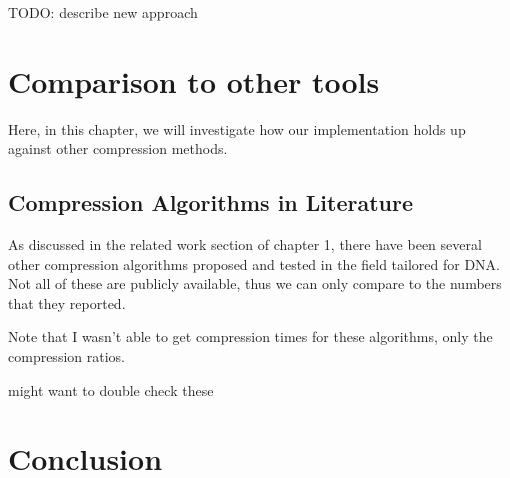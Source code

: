 \documentclass[12pt,twoside]{reedthesis}
\begin{document}
TODO: describe new approach

\hypertarget{comparison-to-other-tools}{%
\chapter{Comparison to other tools}\label{comparison-to-other-tools}}

Here, in this chapter, we will investigate how our implementation holds up against other compression methods.

\hypertarget{compression-algorithms-in-literature}{%
\section{Compression Algorithms in Literature}\label{compression-algorithms-in-literature}}

As discussed in the related work section of chapter 1, there have been several other compression algorithms proposed and tested in the field tailored for DNA. Not all of these are publicly available, thus we can only compare to the numbers that they reported.

Note that I wasn't able to get compression times for these algorithms, only the compression ratios.

might want to double check these
\begin{table}[!h]
\centering
{}
\end{table}
\hypertarget{conclusion}{%
\chapter*{Conclusion}\label{conclusion}}
\end{document}
